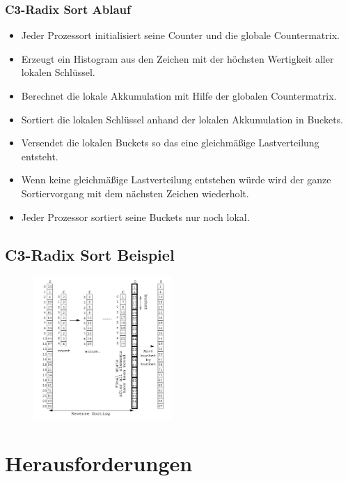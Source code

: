 \documentclass{beamer}
\begin{document}
\begin{frame}
\frametitle{C3-Radix Sort Ablauf}
\begin{itemize}
\item Jeder Prozessort initialisiert seine Counter und die globale Countermatrix.
\item Erzeugt ein Histogram aus den Zeichen mit der h\"ochsten Wertigkeit aller lokalen Schl\"ussel.
\item Berechnet die lokale Akkumulation mit Hilfe der globalen Countermatrix.
\item Sortiert die lokalen Schl\"ussel anhand der lokalen Akkumulation in Buckets.
\item Versendet die lokalen Buckets so das eine gleichmäßige Lastverteilung entsteht.
\item Wenn keine gleichm\"a\ss{}ige Lastverteilung entstehen w\"urde wird der ganze Sortiervorgang mit dem n\"achsten Zeichen wiederholt.
\item Jeder Prozessor sortiert seine Buckets nur noch lokal.
\end{itemize}
\end{frame}


\subsection{C3-Radix Sort Beispiel}
\begin{frame}
	\begin{figure}[ht]
	\includegraphics[width=200px]{C3RadixSort.png}
	\end{figure}
\end{frame}

\section{Herausforderungen}
\end{document}
